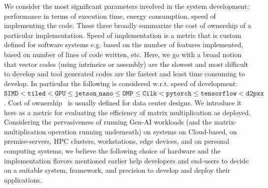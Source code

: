 We consider the most significant parameters involved in the system development: performance in terms of execution time, energy consumption, speed of implementing the code. These three broadly summarize the cost of ownership of a particular implementation. Speed of implementation is a metric that is custom defined for software systems e.g. based on the number of features implemented, based on number of lines of code written, etc. Here, we go with a broad notion that vector codes (using intrinsics or assembly) are the slowest and most difficult to develop and tool generated codes are the fastest and least time consuming to develop. In particular the following is considered w.r.t. speed of development: 
$\texttt{SIMD} < \texttt{tiled} < \texttt{GPU} \leq \texttt{jetson\_nano} \leq \texttt{OMP} \leq \texttt{Cilk} < \texttt{pytorch} \leq \texttt{tensorflow} < \texttt{d2pxx}$. 
Cost of ownership~\cite{barroso2019datacenter} is usually defined for data center designs. We introduce it here as a metric for evaluating the efficiency of matrix multiplication as deployed. Considering the pervasiveness of running Gen-AI workloads (and the matrix-multiplication operation running underneath) on systems on Cloud-based, on premise-servers, HPC clusters, workstations, edge devices, and on personal computing systems, we believe the following choice of hardware and the implementation flavors mentioned earlier help developers and end-users to decide on a suitable system, framework, and precision to develop and deploy their applications.   

